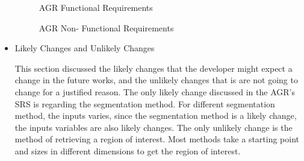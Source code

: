 \begin{itemize}
\begin{figure}[H]
    \centering
    \caption[AGR Functional Requirements]{AGR Functional Requirements}
    \label{fig_agr_fr}
\end{figure}

\begin{figure}[H]
    \centering
    \caption[AGR Non- Functional Requirements]{AGR Non- Functional Requirements}
    \label{fig_agr_nfr}
\end{figure}

\item Likely Changes and Unlikely Changes

This section discussed the likely changes that the developer might expect a change in the future works, and the unlikely changes that is are not going to change for a justified reason. The only likely change discussed in the AGR's SRS is regarding the segmentation method. For different segmentation method, the inputs varies, since the segmentation method is a likely change, the inputs variables are also likely changes. The only unlikely change is the method of retrieving a region of interest. Most methods take a starting point and sizes in different dimensions to get the region of interest.


\end{itemize}
